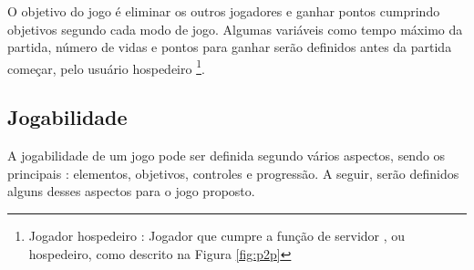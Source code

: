 O objetivo do jogo é eliminar os outros jogadores e ganhar pontos cumprindo objetivos segundo cada modo de jogo. Algumas variáveis como tempo máximo da partida, número de vidas e pontos para ganhar serão definidos antes da partida começar, pelo usuário hospedeiro \footnote{Jogador hospedeiro : Jogador que cumpre a função de servidor , ou hospedeiro, como descrito na Figura \ref{fig:p2p} }.

\subsection{Jogabilidade }\label{subsec:GDDJogabilidade}
A jogabilidade de um jogo pode ser definida segundo vários aspectos, sendo os principais : elementos, objetivos, controles e progressão. A seguir, serão definidos alguns desses aspectos para o jogo proposto.

